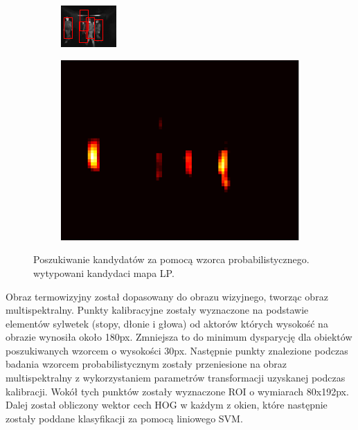 \begin{figure}[h]
\centering
\begin{subfigure}{0.32\textwidth}
\centering
\includegraphics[width=0.9\linewidth]{images/sampleTemplateDetection}
\subcaption{\label{fig:sampleTemplateDetection}}
\end{subfigure}
\begin{subfigure}{0.32\textwidth}
\centering
\includegraphics[width=0.9\linewidth]{images/sampleLP}
\subcaption{\label{fig:sampleLP}}
\end{subfigure}

\caption[Poszukiwanie kandydatów za pomocą wzorca probabilistycznego.]{Poszukiwanie kandydatów za pomocą wzorca probabilistycznego. \protect{} wytypowani kandydaci \protect{} mapa LP.}
\end{figure}
Obraz termowizyjny został dopasowany do obrazu wizyjnego, tworząc obraz multispektralny. Punkty kalibracyjne zostały wyznaczone na podstawie elementów sylwetek (stopy, dłonie i głowa) od aktorów których wysokość na obrazie wynosiła około 180px. Zmniejsza to do minimum dysparycję dla obiektów poszukiwanych wzorcem o wysokości 30px. Następnie punkty znalezione podczas badania wzorcem probabilistycznym zostały przeniesione na obraz multispektralny z wykorzystaniem parametrów transformacji uzyskanej podczas kalibracji. Wokół tych punktów zostały wyznaczone ROI o wymiarach 80x192px. Dalej został obliczony wektor cech HOG w każdym z okien, które następnie zostały poddane klasyfikacji za pomocą liniowego SVM.
